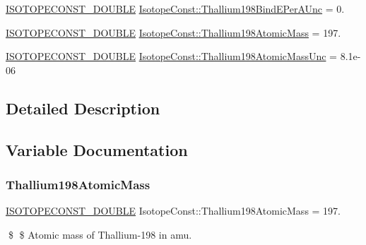 \begin{DoxyCompactItemize}
\mbox{\hyperlink{group___isotope_const-_macros_ga8f45a7272ce02c0b4c65c44636ed719a}{I\+S\+O\+T\+O\+P\+E\+C\+O\+N\+S\+T\+\_\+\+D\+O\+U\+B\+LE}} \mbox{\hyperlink{group___isotope_const-_thallium-_tl198_gabbb5b36f3d764b7b9e417083a9909baa}{Isotope\+Const\+::\+Thallium198\+Bind\+E\+Per\+A\+Unc}} = 0.
\item 
\mbox{\hyperlink{group___isotope_const-_macros_ga8f45a7272ce02c0b4c65c44636ed719a}{I\+S\+O\+T\+O\+P\+E\+C\+O\+N\+S\+T\+\_\+\+D\+O\+U\+B\+LE}} \mbox{\hyperlink{group___isotope_const-_thallium-_tl198_ga7b9bb5cb95ef26451b5c7f54c2c5f59c}{Isotope\+Const\+::\+Thallium198\+Atomic\+Mass}} = 197.
\item 
\mbox{\hyperlink{group___isotope_const-_macros_ga8f45a7272ce02c0b4c65c44636ed719a}{I\+S\+O\+T\+O\+P\+E\+C\+O\+N\+S\+T\+\_\+\+D\+O\+U\+B\+LE}} \mbox{\hyperlink{group___isotope_const-_thallium-_tl198_ga83137c737b631d4b3294b261c0226af0}{Isotope\+Const\+::\+Thallium198\+Atomic\+Mass\+Unc}} = 8.\+1e-\/06
\end{DoxyCompactItemize}


\subsection{Detailed Description}


\subsection{Variable Documentation}
\mbox{\label{group___isotope_const-_thallium-_tl198_ga7b9bb5cb95ef26451b5c7f54c2c5f59c}} 
\subsubsection{\texorpdfstring{Thallium198\+Atomic\+Mass}{Thallium198AtomicMass}}
{\footnotesize\ttfamily \mbox{\hyperlink{group___isotope_const-_macros_ga8f45a7272ce02c0b4c65c44636ed719a}{I\+S\+O\+T\+O\+P\+E\+C\+O\+N\+S\+T\+\_\+\+D\+O\+U\+B\+LE}} Isotope\+Const\+::\+Thallium198\+Atomic\+Mass = 197.}

\$ \$ Atomic mass of Thallium-\/198 in amu. \mbox{\label{group___isotope_const-_thallium-_tl198_ga83137c737b631d4b3294b261c0226af0}} 
